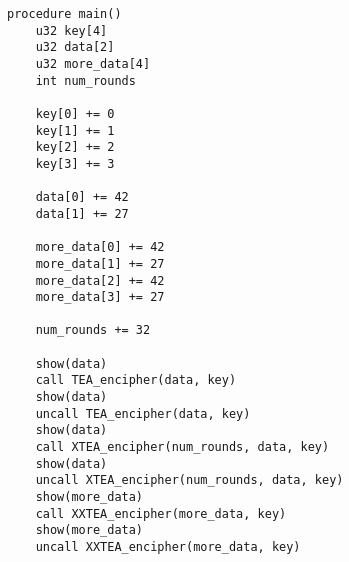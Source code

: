 \documentclass[a4paper,10pt,openright]{memoir}
\begin{document}
\begin{lstlisting}[language=Janus,breaklines=true]
procedure main()
    u32 key[4]
    u32 data[2]
    u32 more_data[4]
    int num_rounds

    key[0] += 0
    key[1] += 1
    key[2] += 2
    key[3] += 3
    
    data[0] += 42
    data[1] += 27
    
    more_data[0] += 42
    more_data[1] += 27
    more_data[2] += 42
    more_data[3] += 27
    
    num_rounds += 32
    
    show(data)
    call TEA_encipher(data, key)
    show(data)
    uncall TEA_encipher(data, key)
    show(data)
    call XTEA_encipher(num_rounds, data, key)
    show(data)
    uncall XTEA_encipher(num_rounds, data, key)
    show(more_data)
    call XXTEA_encipher(more_data, key)
    show(more_data)
    uncall XXTEA_encipher(more_data, key)
\end{lstlisting}
\end{document}
